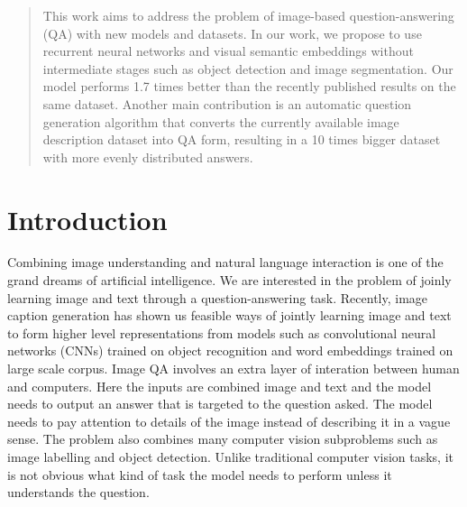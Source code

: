 \documentclass{article}
\renewcommand{\#}[1]{\textbf{#1}}
\begin{document}
 


\begin{abstract}
This work aims to address the problem of image-based question-answering (QA) with new models and datasets. In our work, we propose to use recurrent neural networks and visual semantic embeddings without intermediate stages such as object detection and image segmentation. Our model performs 1.7 times better than the recently published results on the same dataset. Another main contribution is an automatic question generation algorithm that converts the currently available image description dataset into QA form, resulting in a 10 times bigger dataset with more evenly distributed answers.
\end{abstract}

\section{Introduction}
Combining image understanding and natural language interaction is one of the grand dreams of artificial intelligence. We are interested in the problem of joinly learning image and text through a question-answering task. Recently, image caption generation \cite{kiros14b,vinyals14,xu15} has shown us feasible ways of jointly learning image and text to form higher level representations  from models such as convolutional neural networks (CNNs) trained on object recognition and word embeddings trained on large scale corpus. Image QA involves an extra layer of interation between human and computers.  Here the inputs are combined image and text and the model needs to output an answer that is targeted to the question asked. The model needs to pay attention to details of the image instead of describing it in a vague sense. The problem also combines many computer vision subproblems such as image labelling and object detection. Unlike traditional computer vision tasks, it is not obvious what kind of task the model needs to perform unless it understands the question. 
\end{document}
